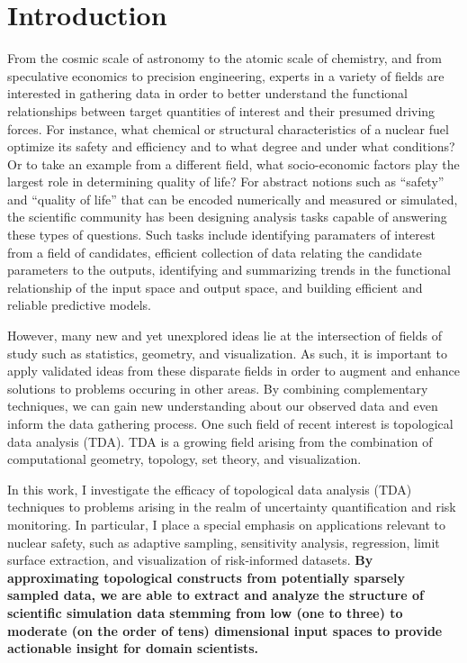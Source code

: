 
\chapter{Introduction}
\label{ch:introduction}
From the cosmic scale of astronomy to the atomic scale of chemistry, and from speculative economics to precision engineering, experts in a variety of fields are interested in gathering data in order to better understand the functional relationships between target quantities of interest and their presumed driving forces.
%
For instance, what chemical or structural characteristics of a nuclear fuel optimize its safety and efficiency and to what degree and under what conditions?
%
Or to take an example from a different field, what socio-economic factors play the largest role in determining quality of life?
%
For abstract notions such as ``safety'' and ``quality of life'' that can be encoded numerically and measured or simulated, the scientific community has been designing analysis tasks capable of answering these types of questions.
%
Such tasks include identifying paramaters of interest from a field of candidates, efficient collection of data relating the candidate parameters to the outputs, identifying and summarizing trends in the functional relationship of the input space and output space, and building efficient and reliable predictive models.

However, many new and yet unexplored ideas lie at the intersection of fields of study such as statistics, geometry, and visualization.
%
As such, it is important to apply validated ideas from these disparate fields in order to augment and enhance solutions to problems occuring in other areas.
%
By combining complementary techniques, we can gain new understanding about our observed data and even inform the data gathering process.
%
One such field of recent interest is topological data analysis (TDA).
%
TDA is a growing field arising from the combination of computational geometry, topology, set theory, and visualization.

In this work, I investigate the efficacy of topological data analysis (TDA) techniques to problems arising in the realm of uncertainty quantification and risk monitoring.
%
In particular, I place a special emphasis on applications relevant to nuclear safety, such as adaptive sampling, sensitivity analysis, regression, limit surface extraction, and visualization of risk-informed datasets.
%
\textbf{By approximating topological constructs from potentially sparsely
sampled data, we are able to extract and analyze the structure of scientific simulation data stemming from low (one to three) to moderate (on the order of tens) dimensional input spaces to provide actionable insight for domain
scientists.}

